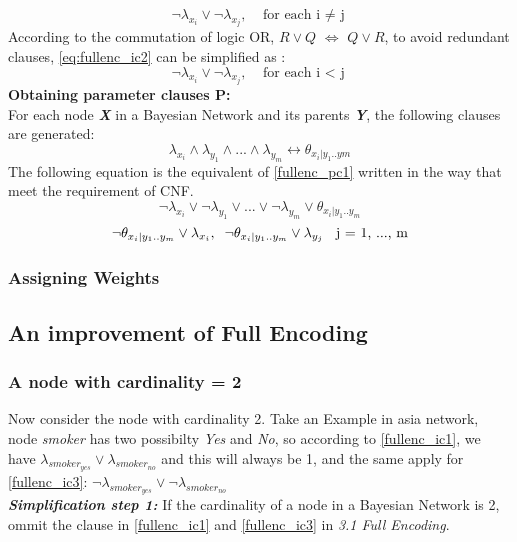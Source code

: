 \documentclass{article}
\begin{document}
\begin{equation}\label{eq:fullenc_ic2}
    \neg\lambda_{x_{i}} \vee \neg\lambda_{x_{j}}, \;\;\; \mbox{for each i $\neq$ j}
\end{equation}
According to the commutation of logic OR, $R \vee Q$ $\Longleftrightarrow$ $Q \vee R$, to avoid redundant clauses, \ref{eq:fullenc_ic2} can be simplified as :
\begin{equation}\label{fullenc_ic3}
    \neg\lambda_{x_{i}} \vee \neg\lambda_{x_{j}}, \;\;\; \mbox{for each i $<$ j}
\end{equation}
\textbf{Obtaining parameter clauses \textsc{P}:}\\
For each node \textbf{\textit{X}} in a Bayesian Network and its parents \textbf{\textit{Y}}, the following clauses are generated:
\begin{equation}\label{fullenc_pc1}
    \lambda_{x_{i}} \wedge \lambda_{y_{1}} \wedge... \wedge \lambda_{y_{m}} \leftrightarrow \theta_{x_{i}|y_{1}..y{m}}
\end{equation}
The following equation is the equivalent of \ref{fullenc_pc1} written in the way that meet the requirement of CNF.
\begin{equation}\label{fullenc_IP}
    \neg\lambda_{x_{i}} \vee \neg\lambda_{y_{1}} \vee... \vee \neg\lambda_{y_{m}} \vee \theta_{x_{i}|y_{1}..y_{m}}
\end{equation}
\begin{equation}\label{fullenc_PI}
    \neg\theta_{x_{i}|y_{1}..y_{m}} \vee \lambda_{x_{i}},\\ \;\;
    \neg\theta_{x_{i}|y_{1}..y_{m}} \vee \lambda_{y_{j}} \;\; \mbox{ j = 1, ..., m}
\end{equation}
\subsubsection{Assigning Weights}
\subsection{An improvement of Full Encoding}
\subsubsection{A node with cardinality = 2}
Now consider the node with cardinality 2. Take an Example in asia network, node \textit{smoker} has two possibilty \textit{Yes} and \textit{No}, so according to \ref{fullenc_ic1}, we have $\lambda_{smoker_{yes}} \vee \lambda_{smoker_{no}}$ and this will always be 1, and the same apply for \ref{fullenc_ic3}: $\neg\lambda_{smoker_{yes}} \vee \neg\lambda_{smoker_{no}}$\\
\textit{\textbf{Simplification step 1:}} If the cardinality of a node in a Bayesian Network is 2, ommit the clause in \ref{fullenc_ic1} and \ref{fullenc_ic3} in \textit{3.1 Full Encoding}.
\end{document}
